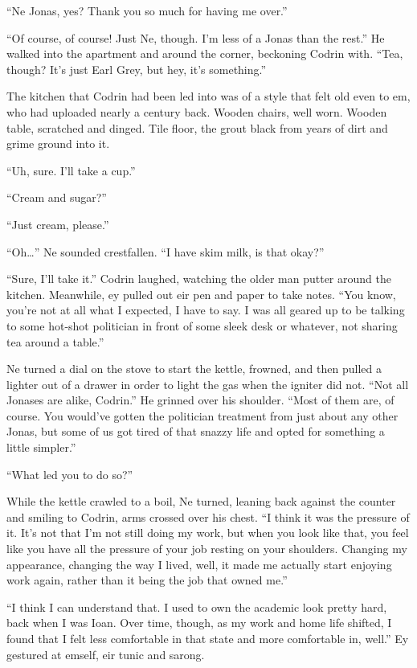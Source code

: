 ``Ne Jonas, yes? Thank you so much for having me over.''

``Of course, of course! Just Ne, though. I'm less of a Jonas than the rest.'' He walked into the apartment and around the corner, beckoning Codrin with. ``Tea, though? It's just Earl Grey, but hey, it's something.''

The kitchen that Codrin had been led into was of a style that felt old even to em, who had uploaded nearly a century back. Wooden chairs, well worn. Wooden table, scratched and dinged. Tile floor, the grout black from years of dirt and grime ground into it.

``Uh, sure. I'll take a cup.''

``Cream and sugar?''

``Just cream, please.''

``Oh\ldots{}'' Ne sounded crestfallen. ``I have skim milk, is that okay?''

``Sure, I'll take it.'' Codrin laughed, watching the older man putter around the kitchen. Meanwhile, ey pulled out eir pen and paper to take notes. ``You know, you're not at all what I expected, I have to say. I was all geared up to be talking to some hot-shot politician in front of some sleek desk or whatever, not sharing tea around a table.''

Ne turned a dial on the stove to start the kettle, frowned, and then pulled a lighter out of a drawer in order to light the gas when the igniter did not. ``Not all Jonases are alike, Codrin.'' He grinned over his shoulder. ``Most of them are, of course. You would've gotten the politician treatment from just about any other Jonas, but some of us got tired of that snazzy life and opted for something a little simpler.''

``What led you to do so?''

While the kettle crawled to a boil, Ne turned, leaning back against the counter and smiling to Codrin, arms crossed over his chest. ``I think it was the pressure of it. It's not that I'm not still doing my work, but when you look like that, you feel like you have all the pressure of your job resting on your shoulders. Changing my appearance, changing the way I lived, well, it made me actually start enjoying work again, rather than it being the job that owned me.''

``I think I can understand that. I used to own the academic look pretty hard, back when I was Ioan. Over time, though, as my work and home life shifted, I found that I felt less comfortable in that state and more comfortable in, well.'' Ey gestured at emself, eir tunic and sarong.

